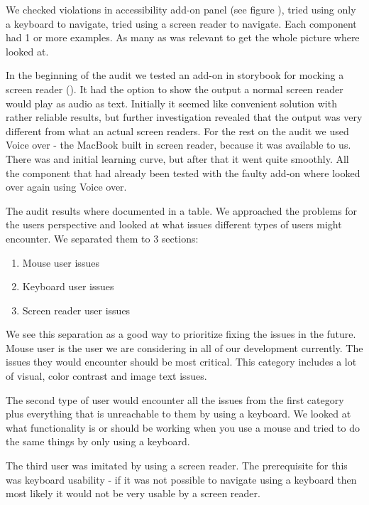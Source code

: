 \documentclass{master_thesis}
\begin{document}
We checked violations in accessibility add-on panel (see figure ), tried using only a keyboard to navigate, tried using a screen reader to navigate. Each component had 1 or more examples. As many as was relevant to get the whole picture where looked at.

In the beginning of the audit we tested an add-on in storybook for mocking a screen reader (). It had the option to show the output a normal screen reader would play as audio as text. Initially it seemed like convenient solution with rather reliable results, but further investigation revealed that the output was very different from what an actual screen readers. For the rest on the audit we used Voice over - the MacBook built in screen reader, because it was available to us. There was and initial learning curve, but after that it went quite smoothly. All the component that had already been tested with the faulty add-on where looked over again using Voice over.

The audit results where documented in a table. We approached the problems for the users perspective and looked at what issues different types of users might encounter. We separated them to 3 sections:
\begin{enumerate}
	\item Mouse user issues
	\item Keyboard user issues
	\item Screen reader user issues
\end{enumerate}

We see this separation as a good way to prioritize  fixing the issues in the future. Mouse user is the user we are considering in all of our development currently. The issues they would encounter should be most critical. This category includes a lot of visual, color contrast and image text issues.

The second type of user would encounter all the issues from the first category plus everything that is unreachable to them by using a keyboard. We looked at what functionality is or should be working when you use a mouse and tried to do the same things by only using a keyboard.

The third user was imitated by using a screen reader. The prerequisite for this was keyboard usability - if it was not possible to navigate using a keyboard then most likely it would not be very usable by a screen reader.
\end{document}
